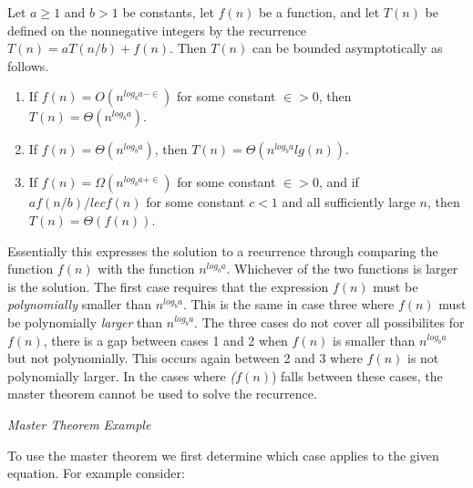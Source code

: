 \documentclass{article}
\begin{document}
\smallskip


\smallskip

Let \textit{$a\geq 1$} and \textit{$b > 1$} be constants, let \textit{$f(n)$} be a function, and let \textit{$T(n)$} be defined on the nonnegative
integers by the recurrence \textit{$T(n) = aT(n/b) + f(n)$}. Then \textit{$T(n)$} can be bounded asymptotically as follows.

\smallskip

\begin{enumerate}
    \item If \textit{$f(n) = O(n^{log_{b}a-\in})$} for some constant \textit{$\in > 0$}, then \textit{$T(n) = \Theta(n^{log_{b}a})$}.
    
    \item If \textit{$f(n) = \Theta(n^{log_{b}a})$}, then \textit{$T(n) = \Theta(n^{log_{b}a}lg(n))$}.
    
    \item If \textit{$f(n) = \Omega(n^{log_{b}a+\in})$} for some constant \textit{$\in > 0$}, and if \textit{$a f(n/b) /le c f(n)$} for some constant
    \textit{$c < 1$} and all sufficiently large \textit{$n$}, then \textit{$T(n) = \Theta(f(n))$}.

\end{enumerate}

\smallskip

\noindent Essentially this expresses the solution to a recurrence through comparing the function \textit{$f(n)$} with the function \textit{$n^{log_{b}a}$}.
Whichever of the two functions is larger is the solution. The first case requires that the expression \textit{$f(n)$} must be \textit{polynomially} smaller
than \textit{$n^{log_{b}a}$}. This is the same in case three where \textit{$f(n)$} must be polynomially \textit{larger} than \textit{$n^{log_{b}a}$}. 
The three cases do not cover all possibilites for \textit{$f(n)$}, there is a gap between cases 1 and 2 when \textit{$f(n)$} is smaller than 
\textit{$n^{log_{b}a}$} but not polynomially. This occurs again between 2 and 3 where \textit{$f(n)$} is not polynomially larger. In the cases where
\textit($f(n)$) falls between these cases, the master theorem cannot be used to solve the recurrence.

\bigskip

\noindent\textit{Master Theorem Example}

To use the master theorem we first determine which case applies to the given equation. For example consider:
\end{document}
